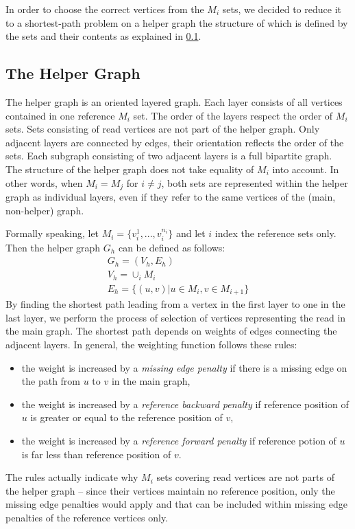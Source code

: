 In order to choose the correct vertices from the $M_i$ sets, we decided to reduce it to a shortest-path problem on a helper graph the structure of which is defined by the sets and their contents as explained in \ref{subsec:helper-graph}.

\subsection{The Helper Graph}
\label{subsec:helper-graph}

The helper graph is an oriented layered graph. Each layer consists of all vertices contained in one reference $M_i$ set. The order of the layers respect the order of $M_i$ sets. Sets consisting of read vertices are not part of the helper graph. Only adjacent layers are connected by edges, their orientation reflects the order of the sets. Each subgraph consisting of two adjacent layers is a full bipartite graph. The structure of the helper graph does not take equality of $M_i$ into account. In other words, when $M_i = M_j$ for $i \ne j$, both sets are represented within the helper graph as individual layers, even if they refer to the same vertices of the (main, non-helper) graph.

Formally speaking, let $M_i = \{v_{i}^{1}, ..., v_{i}^{n_i}\}$ and let $i$ index the reference sets only. Then the helper graph $G_h$ can be defined as follows:
\begin{align*}
G_h = (V_h, E_h) \\
V_h = \cup_i M_i \\
E_h = \{(u, v) | u \in M_i, v \in M_{i + 1}\}
\end{align*}
By finding the shortest path leading from a vertex in the first layer to one in the last layer, we perform the process of selection of vertices representing the read in the main graph. The shortest path depends on weights of edges connecting the adjacent layers. In general, the weighting function follows these rules:
\begin{itemize}
\item the weight is increased by a \textit{missing edge penalty} if there is a missing edge on the path from $u$ to $v$ in the main graph,
\item the weight is increased by a \textit{reference backward penalty} if reference position of $u$ is greater or equal to the reference position of $v$,
\item the weight is increased by a \textit{reference forward penalty} if reference potion of $u$ is far less than reference position of $v$.
\end{itemize}
The rules actually indicate why $M_i$ sets covering read vertices are not parts of the helper graph – since their vertices maintain no reference position, only the missing edge penalties would apply and that can be included within missing edge penalties of the reference vertices only.


